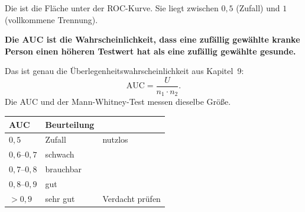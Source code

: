 \begin{definition}
Die  ist die Fläche unter der ROC-Kurve. Sie liegt zwischen $0{,}5$ (Zufall) und $1$ (vollkommene Trennung).
\end{definition}

\begin{merksatz}
\begin{center}
\begin{minipage}{0.9\textwidth}
\textbf{Die AUC ist die Wahrscheinlichkeit, dass eine zufällig gewählte kranke Person einen höheren Testwert hat als eine zufällig gewählte gesunde.}
\end{minipage}
\end{center}

Das ist genau die Überlegenheitswahrscheinlichkeit aus Kapitel~9:
\[ \mathrm{AUC} = \frac{U}{n_1 \cdot n_2} . \]
Die AUC und der Mann-Whitney-Test messen dieselbe Größe.

\begin{center}
{\small
\renewcommand{\arraystretch}{1.48}
\begin{tabular}{@{}P{2.0cm}P{3.0cm}P{2.6cm}@{}}
\toprule
\textbf{AUC} & \textbf{Beurteilung} & \\
\midrule
$0{,}5$ & Zufall & nutzlos\\
$0{,}6$--$0{,}7$ & schwach & \\
$0{,}7$--$0{,}8$ & brauchbar & \\
$0{,}8$--$0{,}9$ & gut & \\
$> 0{,}9$ & sehr gut & \textcolor{mittel}{Verdacht prüfen}\\
\bottomrule
\end{tabular}}
\end{center}

\begin{center}
\begin{minipage}{0.88\textwidth}
\end{minipage}
\end{center}
\end{merksatz}

